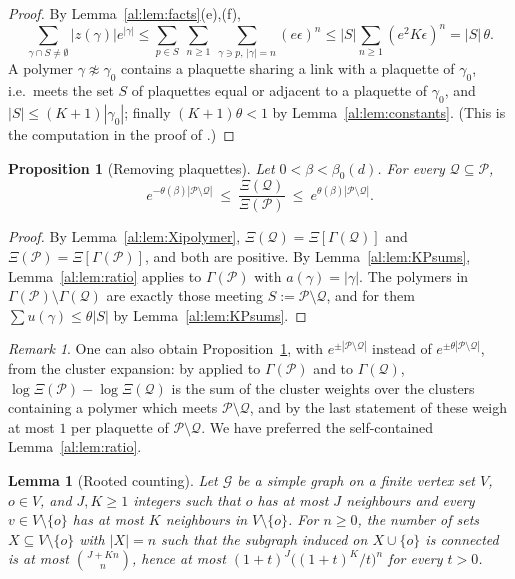 \documentclass[11pt,a4paper]{article}
\newtheorem{lemma}[theorem]{Lemma}
\newtheorem{proposition}[theorem]{Proposition}
\theoremstyle{definition}
\theoremstyle{remark}
\newtheorem{remark}[theorem]{Remark}
\newcommand{\cP}{\mathcal{P}}
\newcommand{\cQ}{\mathcal{Q}}
\newcommand{\Fref}[3]{\cite[#1~`#2' (\texttt{#3})]{F}}
\newcommand{\Flab}[2]{\cite[#1 \texttt{#2}]{F}}
\begin{document}
\begin{proof}
By Lemma~\ref{al:lem:facts}(e),(f),
\[
\sum_{\gamma\cap S\ne\emptyset}|z(\gamma)|e^{|\gamma|}\le\sum_{p\in S}\ \sum_{n\ge1}\ \sum_{\gamma\ni p,\,|\gamma|=n}(e\epsilon)^n
\le|S|\sum_{n\ge1}(e^2K\epsilon)^n=|S|\,\theta .
\]
A polymer $\gamma\not\approx\gamma_0$ contains a plaquette sharing a link with
a plaquette of $\gamma_0$, i.e.\ meets the set $S$ of plaquettes equal or adjacent to a plaquette of $\gamma_0$, and
$|S|\le(K+1)|\gamma_0|$; finally $(K+1)\theta<1$ by Lemma~\ref{al:lem:constants}. (This is the computation in the proof of
\Fref{Theorem}{Convergence of the strong-coupling cluster expansion}{thm:conv}.)
\end{proof}

\begin{proposition}[Removing plaquettes]\label{al:prop:remove}
Let $0<\beta<\beta_0(d)$. For every $\cQ\subseteq\cP$,
\[
e^{-\theta(\beta)|\cP\setminus\cQ|}\ \le\ \frac{\Xi(\cQ)}{\Xi(\cP)}\ \le\ e^{\theta(\beta)|\cP\setminus\cQ|}.
\]
\end{proposition}

\begin{proof}
By Lemma~\ref{al:lem:Xipolymer}, $\Xi(\cQ)=\Xi[\Gamma(\cQ)]$ and $\Xi(\cP)=\Xi[\Gamma(\cP)]$, and both are positive.
By Lemma~\ref{al:lem:KPsums}, Lemma~\ref{al:lem:ratio} applies to $\Gamma(\cP)$ with $a(\gamma)=|\gamma|$. The
polymers in $\Gamma(\cP)\setminus\Gamma(\cQ)$ are exactly those meeting $S:=\cP\setminus\cQ$, and for them
$\sum u(\gamma)\le\theta|S|$ by Lemma~\ref{al:lem:KPsums}.
\end{proof}

\begin{remark}
One can also obtain Proposition~\ref{al:prop:remove}, with $e^{\pm|\cP\setminus\cQ|}$ instead of
$e^{\pm\theta|\cP\setminus\cQ|}$, from the cluster expansion: by \Fref{Cited Theorem}{Kotecký--Preiss 1986}{thm:KP}
applied to $\Gamma(\cP)$ and to $\Gamma(\cQ)$, $\log\Xi(\cP)-\log\Xi(\cQ)$ is the sum of the cluster weights
over the clusters containing a polymer which meets $\cP\setminus\cQ$, and by the last statement of
\Flab{Theorem}{thm:conv} these weigh at most $1$ per plaquette of $\cP\setminus\cQ$. We have preferred the
self-contained Lemma~\ref{al:lem:ratio}.
\end{remark}

\begin{lemma}[Rooted counting]\label{al:lem:rooted}
Let $\mathcal G$ be a simple graph on a finite vertex set $V$, $o\in V$, and $J,K\ge1$ integers such that $o$ has at most
$J$ neighbours and every $v\in V\setminus\{o\}$ has at most $K$ neighbours in $V\setminus\{o\}$. For $n\ge0$, the number of
sets $X\subseteq V\setminus\{o\}$ with $|X|=n$ such that the subgraph induced on $X\cup\{o\}$ is connected is at most
$\binom{J+Kn}{n}$, hence at most $(1+t)^J\bigl((1+t)^K/t\bigr)^n$ for every $t>0$.
\end{lemma}
\end{document}
